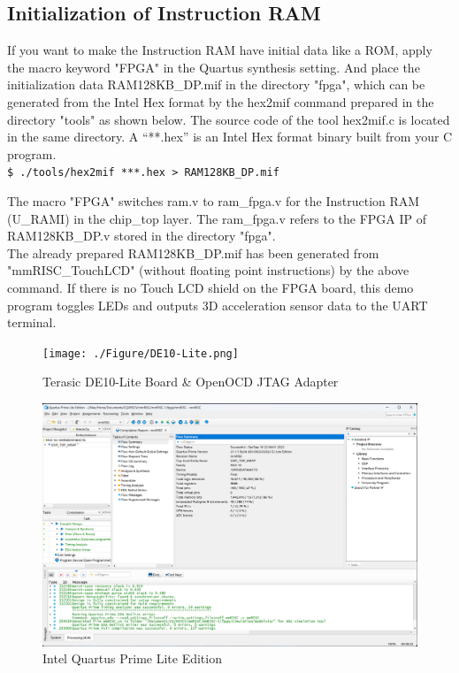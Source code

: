\subsection{Initialization of Instruction RAM}

If you want to make the Instruction RAM have initial data like a ROM, apply the macro keyword "FPGA" in the Quartus synthesis setting. And place the initialization data RAM128KB\_DP.mif in the directory "fpga", which can be generated from the Intel Hex format by the hex2mif command prepared in the directory "tools" as shown below. The source code of the tool hex2mif.c is located in the same directory. A “**.hex” is an Intel Hex format binary built from your C program.\\

\texttt{\$ ./tools/hex2mif ***.hex >  RAM128KB\_DP.mif}

The macro "FPGA" switches ram.v to ram\_fpga.v for the Instruction RAM (U\_RAMI) in the chip\_top layer. The ram\_fpga.v refers to the FPGA IP of RAM128KB\_DP.v stored in the directory "fpga".\\

The already prepared RAM128KB\_DP.mif has been generated from "mmRISC\_TouchLCD" (without floating point instructions) by the above command. If there is no Touch LCD shield on the FPGA board, this demo program toggles LEDs and outputs 3D acceleration sensor data to the UART terminal.


\begin{figure}
    \texttt{[image: ./Figure/DE10-Lite.png]}
    \caption{Terasic DE10-Lite Board \& OpenOCD JTAG Adapter}
    \label{fig:DE10LITE}
\end{figure}

\begin{figure}
    \includegraphics[width=1.0\columnwidth]{./Figure/QuestaPrime.png}
    \caption{Intel Quartus Prime Lite Edition}
    \label{fig:QUESTAPRIME}
\end{figure}

